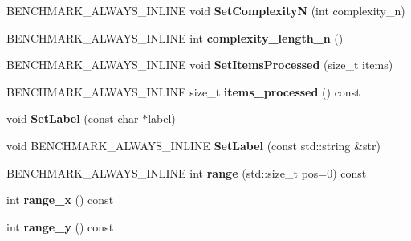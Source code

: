 \begin{DoxyCompactItemize}
B\+E\+N\+C\+H\+M\+A\+R\+K\+\_\+\+A\+L\+W\+A\+Y\+S\+\_\+\+I\+N\+L\+I\+NE void {\bfseries Set\+ComplexityN} (int complexity\+\_\+n)
\item 
\mbox{\label{classbenchmark_1_1_state_a2c7c1ea5a0a9c638d622532613c07a72}} 
B\+E\+N\+C\+H\+M\+A\+R\+K\+\_\+\+A\+L\+W\+A\+Y\+S\+\_\+\+I\+N\+L\+I\+NE int {\bfseries complexity\+\_\+length\+\_\+n} ()
\item 
\mbox{\label{classbenchmark_1_1_state_abc9dabb5a36de1f595f834ee8b3eec10}} 
B\+E\+N\+C\+H\+M\+A\+R\+K\+\_\+\+A\+L\+W\+A\+Y\+S\+\_\+\+I\+N\+L\+I\+NE void {\bfseries Set\+Items\+Processed} (size\+\_\+t items)
\item 
\mbox{\label{classbenchmark_1_1_state_a1fe5fe2dc025de3b4f76b879e19a6b50}} 
B\+E\+N\+C\+H\+M\+A\+R\+K\+\_\+\+A\+L\+W\+A\+Y\+S\+\_\+\+I\+N\+L\+I\+NE size\+\_\+t {\bfseries items\+\_\+processed} () const
\item 
\mbox{\label{classbenchmark_1_1_state_af6c5b4524dfc34e9a6edac6d0ba221c4}} 
void {\bfseries Set\+Label} (const char $\ast$label)
\item 
\mbox{\label{classbenchmark_1_1_state_a64de1c056d82f6805512a165b3f8f051}} 
void B\+E\+N\+C\+H\+M\+A\+R\+K\+\_\+\+A\+L\+W\+A\+Y\+S\+\_\+\+I\+N\+L\+I\+NE {\bfseries Set\+Label} (const std\+::string \&str)
\item 
\mbox{\label{classbenchmark_1_1_state_ad9f83c86a0777f9c2b4e95d76b34481a}} 
B\+E\+N\+C\+H\+M\+A\+R\+K\+\_\+\+A\+L\+W\+A\+Y\+S\+\_\+\+I\+N\+L\+I\+NE int {\bfseries range} (std\+::size\+\_\+t pos=0) const
\item 
\mbox{\label{classbenchmark_1_1_state_af9bb19ab7b3ff9d925352d6c4e360a67}} 
int {\bfseries range\+\_\+x} () const
\item 
\mbox{\label{classbenchmark_1_1_state_a8dc462858520eb8850ff1adb6d81e491}} 
int {\bfseries range\+\_\+y} () const
\item 
\mbox{\label{classbenchmark_1_1_state_a3627c5b1d224fc0bfa2e141391e73816}} 

\end{DoxyCompactItemize}
